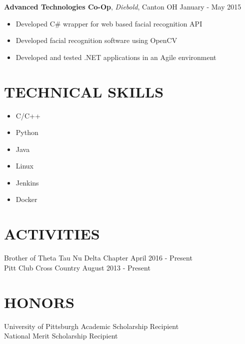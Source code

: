 \documentclass[line,margin]{res}
\begin{document}
\begin{resume}
    \textbf{Advanced Technologies Co-Op}, \textit{Diebold}, Canton OH \hfill January - May 2015 \\
    \begin{itemize}
        \item Developed C\# wrapper for web based facial recognition API
        \item Developed facial recognition software using OpenCV
        \item Developed and tested .NET applications in an Agile environment
    \end{itemize}

    \section{TECHNICAL SKILLS}
    \begin{itemize}
        \item C/C++
        \item Python
        \item Java
        \item Linux
        \item Jenkins
        \item Docker
    \end{itemize}


    \section{ACTIVITIES}
    Brother of Theta Tau Nu Delta Chapter \hfill April 2016 - Present \\
    Pitt Club Cross Country \hfill August 2013 - Present

    \section{HONORS}
    University of Pittsburgh Academic Scholarship Recipient \\
    National Merit Scholarship Recipient


\end{resume}
\end{document}
